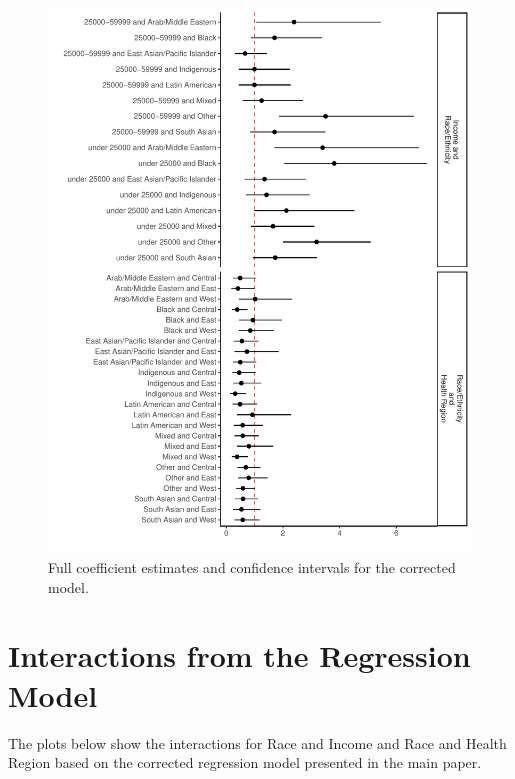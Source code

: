 \documentclass[
  letterpaper,
  DIV=11,
  numbers=noendperiod]{scrartcl}
\begin{document}
\begin{figure}

\includegraphics{appendix_files/figure-pdf/fig-model-corr-appendix-1.pdf} \hfill{}

\caption{\label{fig-model-corr-appendix}Full coefficient estimates and
confidence intervals for the corrected model.}

\end{figure}

\FloatBarrier

\hypertarget{interactions-from-the-regression-model}{%
\section{Interactions from the Regression
Model}\label{interactions-from-the-regression-model}}

The plots below show the interactions for Race and Income and Race and
Health Region based on the corrected regression model presented in the
main paper.
\end{document}
